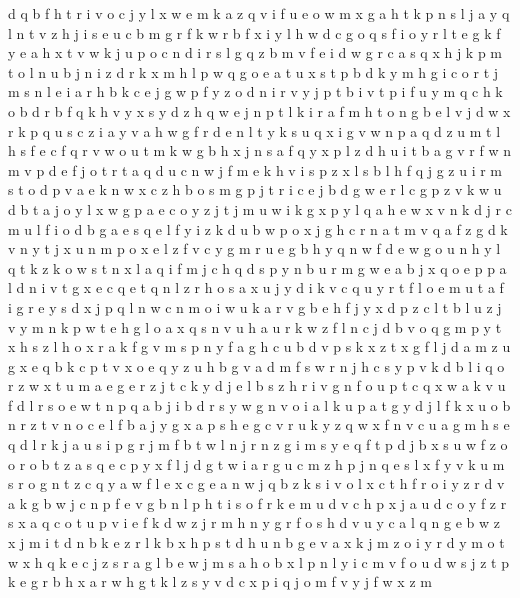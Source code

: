 \documentclass{article}
\begin{document}
d q b f h t r i v o c j y l x w e m k a z
q v i f u e o w m x g a h t k p n s l j
a y q l n t v z h j i s e u c b m g r f k w
r b f x i y l h w d c g o q
s f i o y r l t e g k
f y e a h x t v w k j u p o c n d i r s l g q z b m
v f e i d w g r c a s q x h j k p m t o l n u b
j n i z d r k x m h l p w q g o e a t u
x s t p b d k y m h g i c o r
t
j m s n l e i a r
h b k c e j g w p f y z o d n i r v
y j
p t b
i
v t p i f u y m q c h k o b
d r b f q
k h v y
x s y d z h q w e j n p t l k i r a
f m h t o n g b e l v j d w x r k p q u s c z i a y
v a h w g f r d e n l t y k s u q x i
g v w n p a q d z u m t l h s f e c
f q r v w o
u t m k w g b h x j n s a f q y
x p l z d h u i t b a g v r f w n m
v p d e f j o t
r t a q d u c n w j f m e k h v i s p z x
l s
b l h f q j g z u i r m s t o d p v a e k n w x c
z h b o s m g p j t r i c e
j b d g w
e r l c g p z v k w u d b t a j o y
l x w g p a e c o y z j
t j m u w i k g x p y l q
a h e w x v n k d j r c m u l f i
o d b g a e
s q e l f y i z k d u b w p o x j g h c r n a t m v
q a f z g d k v n y t j x
u n m p o x e l z f v c y g
m r u e g b h y q n w f d
e w g o u n h y l q t
k z
k o w s t n x l a q i f m j c h
q d s p y n b u r m g w e a
b j x q o e p
p a l d n i v t g x e c q
e t q n l z r h o s a x u j y d i k v c
q u y r t f l o e
m u t a f i g r e y s d x j p q l n w c
n m o i w u k a r v g b e h f j y x d p z c l t
b l
u z j v y m n k p w t e h g l o a x q s
n v u h
a u r k w z f l n c j d b v o q g m p y t x h s
z l h o x r a k f g v m s p n y
f a g h c u b d v p s k x z t
x g
f l j d a m z u g x e q b k c p t v
x o e q y z u h b g v a d m f s w r
n j h c s y p v k d b l i q o r z w x t u m a e g
e r z j t c k
y d j e l b s z h r i v g n f o u p t c q x w a k
v u f d l r s o e w t n p q a b j i
b d r s y w g n v o i a l k u p
a t g y d j l f k x u o b n r z
t v n o c e l f
b a j y g x
a p s h e g c v r u k y z q w
x f n v c u a g m h s e q d l r k j
a u s i p g r j m f b t w l n
j r n z g i m s y e q f t p d
j b x s u w f z o
o
r o b t z a s q e c p y x f l j d g
t w i a r g u c m z h p j n q e s l x f y v k
u m s r o g n t z c q y a w f l e x
c g
e a n w j q b z k s i v o l x c t h f r
o i y z r d v a k g b w j c n p
f e v g b n l p h t i s o
f r k e m u d v c
h p x j a u d c o y f z r
s x a q c o t u p v i e f k d w z j r m h n y g
r f o s h d v u y c a l q n g e b w z x j m i t
d n b k e z r l
k b x h
p s t d h u n b g e v a x k j m z o i y r
d y m o t w x h q k e c j z s r a g l b
e w
j m s a h o b x l p
n l y i c m v f o u d w s j z t p k e g r b h x
a r w h g t k l z s y v d c x p i q j o m f
v
y j f w x z m
\end{document}
